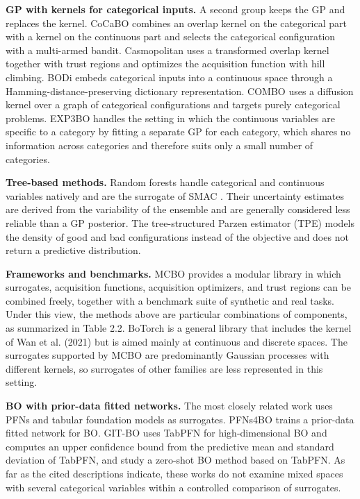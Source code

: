 \textbf{GP with kernels for categorical inputs.} A second group keeps the GP and replaces the kernel. CoCaBO \citep{pmlr-v119-ru20a} combines an overlap kernel on the categorical part with a kernel on the continuous part and selects the categorical configuration with a multi-armed bandit. Casmopolitan \citep{pmlr-v139-wan21b} uses a transformed overlap kernel together with trust regions and optimizes the acquisition function with hill climbing. BODi \citep{pmlr-v206-deshwal23a} embeds categorical inputs into a continuous space through a Hamming-distance-preserving dictionary representation. COMBO \citep{NEURIPS2019_2cb6b103} uses a diffusion kernel over a graph of categorical configurations and targets purely categorical problems. EXP3BO \citep{NEURIPS2018_cc709032} handles the setting in which the continuous variables are specific to a category by fitting a separate GP for each category, which shares no information across categories and therefore suits only a small number of categories.

\textbf{Tree-based methods.} Random forests handle categorical and continuous variables natively and are the surrogate of SMAC \citep{10.1007/978-3-642-25566-3_40}. Their uncertainty estimates are derived from the variability of the ensemble and are generally considered less reliable than a GP posterior. The tree-structured Parzen estimator (TPE) \citep{NIPS2011_86e8f7ab} models the density of good and bad configurations instead of the objective and does not return a predictive distribution.

\textbf{Frameworks and benchmarks.} MCBO \citep{NEURIPS2023_dbc4b67c} provides a modular library in which surrogates, acquisition functions, acquisition optimizers, and trust regions can be combined freely, together with a benchmark suite of synthetic and real tasks. Under this view, the methods above are particular combinations of components, as summarized in Table 2.2. BoTorch \citep{NEURIPS2020_f5b1b89d} is a general library that includes the kernel of Wan et al. (2021) but is aimed mainly at continuous and discrete spaces. The surrogates supported by MCBO are predominantly Gaussian processes with different kernels, so surrogates of other families are less represented in this setting.

\textbf{BO with prior-data fitted networks.} The most closely related work uses PFNs and tabular foundation models as surrogates. PFNs4BO \citep{pmlr-v202-muller23a} trains a prior-data fitted network for BO. GIT-BO \citep{ICLR2026_b54bafb9} uses TabPFN for high-dimensional BO and computes an upper confidence bound from the predictive mean and standard deviation of TabPFN, and \citet{Rogers2026} study a zero-shot BO method based on TabPFN. As far as the cited descriptions indicate, these works do not examine mixed spaces with several categorical variables within a controlled comparison of surrogates. %


